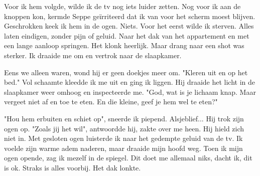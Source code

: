 \documentclass[12pt, justified, a4paper, symmetric]{tufte-book}
\begin{document}
Voor ik hem volgde, wilde ik de tv nog iets luider zetten. Nog voor ik aan de knoppen kon, kermde Seppe geïrriteerd dat ik van voor het scherm moest blijven. Geschrokken keek ik hem in de ogen. Niets. Voor het eerst wilde ik sterven. Alles laten eindigen, zonder pijn of geluid. Naar het dak van het appartement en met een lange aanloop springen. Het klonk heerlijk. Maar drang naar een shot was sterker. Ik draaide me om en vertrok naar de slaapkamer.

Eens we alleen waren, wond hij er geen doekjes meer om. "Kleren uit en op het bed." Vol schaamte kleedde ik me uit en ging ik liggen. Hij draaide het licht in de slaapkamer weer omhoog en inspecteerde me. "God, wat is je lichaam knap. Maar vergeet niet af en toe te eten. En die kleine, geef je hem wel te eten?"

"Hou hem erbuiten en schiet op", sneerde ik piepend. Alsjeblief...
Hij trok zijn ogen op. "Zoals jij het wil", antwoordde hij, zakte over me heen. Hij hield zich niet in. Met gesloten ogen luisterde ik naar het gedempte geluid van de tv. Ik voelde zijn warme adem naderen, maar draaide mijn hoofd weg. Toen ik mijn ogen opende, zag ik mezelf in de spiegel. Dit doet me allemaal niks, dacht ik, dit is ok. Straks is alles voorbij. Het dak lonkte.
\end{document}
